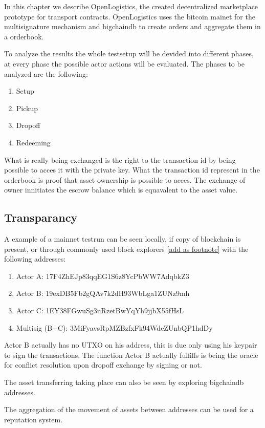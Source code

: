 In this chapter we describe OpenLogistics, the created decentralized  marketplace prototype for transport contracts. OpenLogistics uses the bitcoin mainet for the multisignature mechanism and bigchaindb to create orders and aggregate them in a orderbook. \par

To analyze the results the whole testsetup will be devided into different phases, at every phase the possible actor actions will be evaluated. The phases to be analyzed are the following:
\begin{enumerate}
  \item Setup
  \item Pickup
  \item Dropoff
  \item Redeeming
\end{enumerate}

What is really being exchanged is the right to the transaction id by being possible to acces it with the private key. What the transaction id represent in the orderbook is proof that asset ownership is possible to acces. The exchange of owner innitiates the escrow balance which is equavalent to the asset value.

\subsection{Transparancy}

A example of a mainnet testrun can be seen locally, if copy of blockchain is present, or through commonly used block explorers \href{https://www.blocktrail.com/BTC}{[add as footnote]}
 with the following addresses:
\begin{enumerate}
  \item Actor A: 17F4ZhEJp83qqEG1S6z8YcPbWW7AdqbkZ3
  \item Actor B: 19exDB5Fb2gQAv7k2dH93WbLga1ZUNz9mh
  \item Actor C: 1EY38FGwuSg3uRzetBwYqYh9jjbX55fHsL
  \item Multisig (B+C): 3MiFyavsRpMZBzfxFk94WdeZUnbQP1hdDy
\end{enumerate}

Actor B actually has no UTXO on his address, this is due only using his keypair to sign the transactions. The function Actor B actually fulfills is being the oracle for conflict resolution upon dropoff exchange by signing or not.\par
The asset transferring taking place can also be seen by exploring bigchaindb addresses. \par
The aggregation of the movement of assets between addresses can be used for a reputation system.
